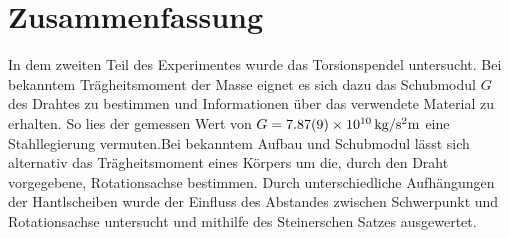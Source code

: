
\section{Zusammenfassung}


In dem zweiten Teil des Experimentes wurde das Torsionspendel untersucht. Bei bekanntem Trägheitsmoment der Masse eignet es sich dazu das Schubmodul $G$ des Drahtes zu bestimmen und Informationen über das verwendete Material zu erhalten. So lies der gemessen Wert von $G=\SI{7.87+-0.09e10}{kg \per \second \squared  \metre}$ eine Stahllegierung vermuten.Bei bekanntem Aufbau und Schubmodul lässt sich alternativ das Trägheitsmoment eines Körpers um die, durch den Draht vorgegebene, Rotationsachse bestimmen. Durch unterschiedliche Aufhängungen der Hantlscheiben wurde der Einfluss des Abstandes zwischen Schwerpunkt und Rotationsachse untersucht und mithilfe des Steinerschen Satzes ausgewertet.